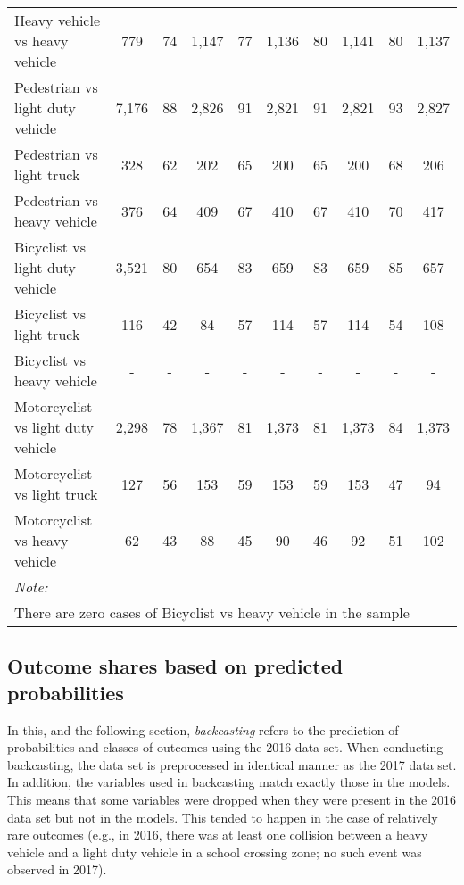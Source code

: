 \documentclass[]{elsarticle} %
\begin{document}
\begin{landscape}
\begin{table}
{\begin{tabular}[t]{lccccccccc}
\rowcolor{gray!6}  Heavy vehicle vs heavy vehicle & 779 & 74 & 1,147 & 77 & 1,136 & 80 & 1,141 & 80 & 1,137\\
Pedestrian vs light duty vehicle & 7,176 & 88 & 2,826 & 91 & 2,821 & 91 & 2,821 & 93 & 2,827\\
\addlinespace
\rowcolor{gray!6}  Pedestrian vs light truck & 328 & 62 & 202 & 65 & 200 & 65 & 200 & 68 & 206\\
Pedestrian vs heavy vehicle & 376 & 64 & 409 & 67 & 410 & 67 & 410 & 70 & 417\\
\rowcolor{gray!6}  Bicyclist vs light duty vehicle & 3,521 & 80 & 654 & 83 & 659 & 83 & 659 & 85 & 657\\
Bicyclist vs light truck & 116 & 42 & 84 & 57 & 114 & 57 & 114 & 54 & 108\\
\rowcolor{gray!6}  Bicyclist vs heavy vehicle & - & - & - & - & - & - & - & - & -\\
\addlinespace
Motorcyclist vs light duty vehicle & 2,298 & 78 & 1,367 & 81 & 1,373 & 81 & 1,373 & 84 & 1,373\\
\rowcolor{gray!6}  Motorcyclist vs light truck & 127 & 56 & 153 & 59 & 153 & 59 & 153 & 47 & 94\\
Motorcyclist vs heavy vehicle & 62 & 43 & 88 & 45 & 90 & 46 & 92 & 51 & 102\\
\bottomrule
\multicolumn{10}{l}{\textit{Note: }}\\
\multicolumn{10}{l}{There are zero cases of Bicyclist vs heavy vehicle in the sample}\\
\end{tabular}}
\end{table}
\end{landscape}

\hypertarget{sec:outcomes-shares}{%
\subsection{Outcome shares based on predicted
probabilities}\label{sec:outcomes-shares}}

In this, and the following section, \emph{backcasting} refers to the
prediction of probabilities and classes of outcomes using the 2016 data
set. When conducting backcasting, the data set is preprocessed in
identical manner as the 2017 data set. In addition, the variables used
in backcasting match exactly those in the models. This means that some
variables were dropped when they were present in the 2016 data set but
not in the models. This tended to happen in the case of relatively rare
outcomes (e.g., in 2016, there was at least one collision between a
heavy vehicle and a light duty vehicle in a school crossing zone; no
such event was observed in 2017).
\end{document}
